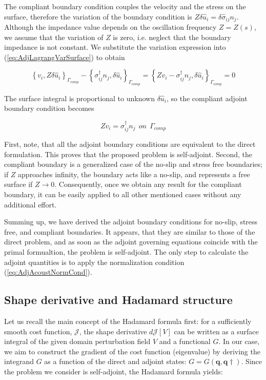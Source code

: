 The compliant boundary condition couples the velocity and the stress on the surface, therefore the variation of the boundary condition is $Z \delta \hat{u}_i = \delta \hat{\sigma}_{ij} n_j$. Although the impedance value depends on the oscillation frequency $Z = Z(s)$, we assume that the variation of $Z$ is zero, i.e. neglect that the boundary impedance is not constant. We substitute the variation expression into (\ref{eq:AdjLagrangVarSurface}) to obtain

\begin{equation}
\left\{ v_i , Z \delta \hat{u}_i \right\}_{\Gamma_{comp}} - \left\{\sigma_{ij}^\dagger  n_j,  \delta \hat{u}_i \right\}_{\Gamma_{comp}} = \left\{ Z v_i -\sigma_{ij}^\dagger  n_j , \delta \hat{u}_i \right\}_{\Gamma_{comp}} =  0
\end{equation}

The surface integral is proportional to unknown $\delta \hat{u}_i$, so the compliant adjoint boundary condition becomes

\begin{equation}
Z v_i = \sigma_{ij}^\dagger  n_j \ \ on \ \ \Gamma_{comp}
\end{equation}

First, note, that all the adjoint boundary conditions are equivalent to the direct formulation. This proves that the proposed problem is self-adjoint. Second, the compliant boundary is a generalized case of the no-slip and stress free boundaries; if $Z$ approaches infinity, the boundary acts like a no-slip, and represents a free surface if $Z \to 0$. Consequently, once we obtain any result for the compliant boundary, it can be easily applied to all other mentioned cases without any additional effort.


Summing up, we have derived the adjoint boundary conditions for no-slip, stress free, and compliant boundaries. It appears, that they are similar to those of the direct problem, and as soon as the adjoint governing equations coincide with the primal formualtion, the problem is self-adjoint. The only step to calculate the adjoint quantities is to apply the normalization condition (\ref{eq:AdjAcoustNormCond}). 

\subsection{Shape derivative and Hadamard structure}

Let us recall the main concept of the Hadamard formula first: for a sufficiently smooth cost function, $\mathcal{J}$, the shape derivative $d\mathcal{J}[V]$ can be written as a surface integral of the given domain perturbation field $V$ and a functional $G$. In our case, we aim to construct the gradient of the cost function (eigenvalue) by deriving the integrand $G$ as a function of the direct and adjoint states: $G = G(\textbf{q}, \textbf{q}\dagger)$. Since the problem we consider is self-adjoint, the Hadamard formula yields:

